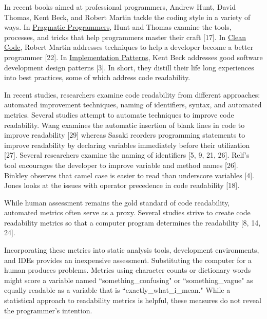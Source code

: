 \documentclass[conference]{IEEEtran}
\begin{document}
In recent books aimed at professional programmers, Andrew Hunt, David Thomas, Kent Beck, and Robert Martin tackle the coding style in a variety of ways. In \underline{Pragmatic Programmers}, Hunt and Thomas examine the tools, processes, and tricks that help programmers master their craft [17]. In \underline{Clean Code}, Robert Martin addresses techniques to help a developer become a better programmer [22]. In \underline{Implementation Patterns}, Kent Beck addresses good software development design patterns [3]. In short, they distill their life long experiences into best practices, some of which address code readability.

In recent studies, researchers examine code readability from different approaches: automated improvement techniques, naming of identifiers, syntax, and automated metrics. Several studies attempt to automate techniques to improve code readability. Wang examines the automatic insertion of blank lines in code to improve readability [29] whereas Sasaki reorders programming statements to improve readability by declaring variables immediately before their utilization [27]. Several researchers examine the naming of identifiers [5, 9, 21, 26]. Relf’s tool encourages the developer to improve variable and method names [26]. Binkley observes that camel case is easier to read than underscore variables [4]. Jones looks at the issues with operator precedence in code readability [18].

While human assessment remains the gold standard of code readability, automated metrics often serve as a proxy. Several studies strive to create code readability metrics so that a computer program determines the readability [8, 14, 24].

Incorporating these metrics into static analysis tools, development environments, and IDEs provides an inexpensive assessment. Substituting the computer for a human produces problems. Metrics using character counts or dictionary words might score a variable named ``something_confusing" or ``something_vague" as equally readable as a variable that is ``exactly_what_i_mean." While a statistical approach to readability metrics is helpful, these measures do not reveal the programmer’s intention.
\end{document}
